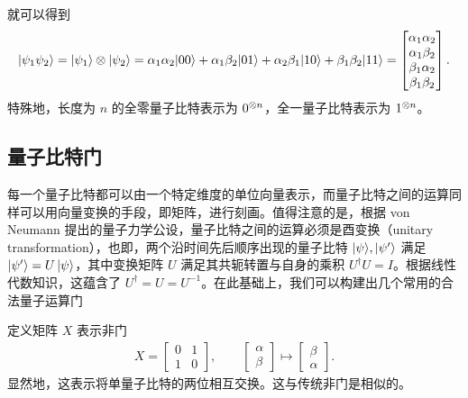 \documentclass[a4paper,11pt,onecolumn,twoside]{article}
\begin{document}
就可以得到
\begin{align}
    |\psi_1\psi_2\rangle=|\psi_1\rangle\otimes|\psi_2\rangle=\alpha_1\alpha_2|00\rangle+\alpha_1\beta_2|01\rangle+\alpha_2\beta_1|10\rangle+\beta_1\beta_2|11\rangle=
    \begin{bmatrix}
        \alpha_1\alpha_2 \\\alpha_1\beta_2\\\beta_1\alpha_2\\\beta_1\beta_2
    \end{bmatrix}.
\end{align}
特殊地，长度为 $n$ 的全零量子比特表示为 $0^{\otimes n}$，全一量子比特表示为 $1^{\otimes n}$。

\subsection{量子比特门}

每一个量子比特都可以由一个特定维度的单位向量表示，而量子比特之间的运算同样可以用向量变换的手段，即矩阵，进行刻画。值得注意的是，根据 von Neumann 提出的量子力学公设\cite{von2018mathematical}，量子比特之间的运算必须是酉变换（unitary transformation），也即，两个沿时间先后顺序出现的量子比特 $|\psi\rangle,|\psi'\rangle$ 满足 $|\psi'\rangle=U\,|\psi\rangle$，其中变换矩阵 $U$ 满足其共轭转置与自身的乘积 $U^\dagger U=I$。根据线性代数知识，这蕴含了 $U^\dagger=U=U^{-1}$。在此基础上，我们可以构建出几个常用的合法量子运算门

定义矩阵 $X$ 表示非门 \begin{align}
    X=\begin{bmatrix}
          0 & 1 \\
          1 & 0
      \end{bmatrix},\qquad
    \begin{bmatrix}
        \alpha \\\beta
    \end{bmatrix}\mapsto
    \begin{bmatrix}
        \beta \\\alpha
    \end{bmatrix}.
\end{align}
显然地，这表示将单量子比特的两位相互交换。这与传统非门是相似的。
\end{document}
